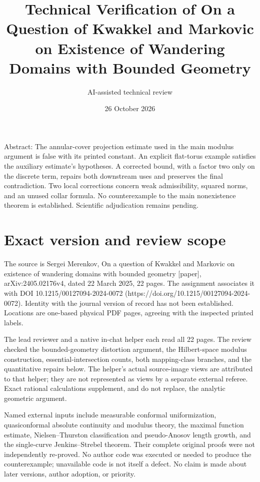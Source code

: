\documentclass[10pt]{article}
\title{Technical Verification of
On a Question of Kwakkel and Markovic on Existence
of Wandering Domains with Bounded Geometry}
\author{AI-assisted technical review}
\date{26 October 2026}
\begin{document}
\maketitle
Abstract: The annular-cover projection estimate used in the main modulus argument is false with its printed constant. An explicit flat-torus example satisfies the auxiliary estimate’s hypotheses. A corrected bound, with a factor two only on the discrete term, repairs both downstream uses and preserves the final contradiction. Two local corrections concern weak admissibility, squared norms, and an unused collar formula. No counterexample to the main nonexistence theorem is established. Scientific adjudication remains pending.\par
\section*{Exact version and review scope}
The source is Sergei Merenkov, On a question of Kwakkel and Markovic on existence of wandering domains with bounded geometry [paper], arXiv:2405.02176v4, dated 22 March 2025, 22 pages. The assignment associates it with DOI 10.1215/00127094-2024-0072 (https://doi.org/10.1215/00127094-2024-0072). Identity with the journal version of record has not been established. Locations are one-based physical PDF pages, agreeing with the inspected printed labels.\par
The lead reviewer and a native in-chat helper each read all 22 pages. The review checked the bounded-geometry distortion argument, the Hilbert-space modulus construction, essential-intersection counts, both mapping-class branches, and the quantitative repairs below. The helper’s actual source-image views are attributed to that helper; they are not represented as views by a separate external referee. Exact rational calculations supplement, and do not replace, the analytic geometric argument.\par
Named external inputs include measurable conformal uniformization, quasiconformal absolute continuity and modulus theory, the maximal function estimate, Nielsen–Thurston classification and pseudo-Anosov length growth, and the single-curve Jenkins–Strebel theorem. Their complete original proofs were not independently re-proved. No author code was executed or needed to produce the counterexample; unavailable code is not itself a defect. No claim is made about later versions, author adoption, or priority.\par
\end{document}
